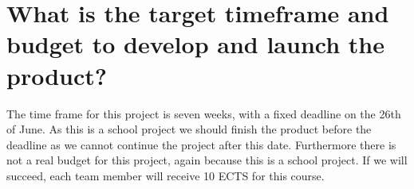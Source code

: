 \section{What is the target timeframe and budget to develop and launch the product?}
The time frame for this project is seven weeks, with a fixed deadline on the 26th of June.
As this is a school project we should finish the product before the deadline as we cannot continue the project after this date.
Furthermore there is not a real budget for this project, again because this is a school project. If we will succeed, each team member will receive 10 ECTS for this course.